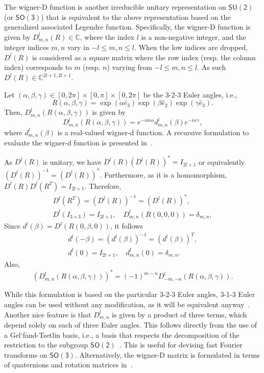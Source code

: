 \documentclass{ieeetran}
\newcommand{\SO}{\ensuremath{\mathsf{SO(3)}}}
\newcommand{\Cp}{\ensuremath{\mathbb{C}}}
\begin{document}
The wigner-D function is another irreducible unitary representation on $\mathsf{SU(2)}$ (or $\SO$) that is equivalent to the above representation based on the generalized associated Legendre function. Specifically, the wigner-D function is given by $D^l_{m,n}(R)\in\Cp$, where the index $l$ is a non-negative integer, and the integer indices $m,n$ vary in $-l\leq m,n \leq l$. When the low indices are dropped, $D^l(R)$ is considered as a square matrix where the row index (resp. the column index) corresponds to $m$ (resp. $n$) varying from $-l\leq m,n \leq l$. As such $D^l(R)\in\Cp^{2l+1,2l+1}$.

Let $(\alpha,\beta,\gamma)\in[0,2\pi]\times[0,\pi]\times[0,2\pi]$ be the 3-2-3 Euler angles, i.e., 
\[
R(\alpha,\beta,\gamma)=\exp(\alpha\hat e_3)\exp(\beta\hat e_2)\exp(\gamma\hat e_3). 
\]
Then, $D^l_{m,n}(R(\alpha,\beta,\gamma))$ is given by
\[
D^l_{m,n}(R(\alpha,\beta,\gamma)) = e^{-i m\alpha} d^l_{m,n}(\beta) e^{-i n\gamma},
\]
where $d^l_{m,n}(\beta)$ is a real-valued wigner-d function. A recursive formulation to evaluate the wigner-d function is presented in~\cite{BlaFloJMS97}. 

As $D^l(R)$ is unitary, we have $D^l(R)(D^{l}(R))^*=I_{2l+1}$ or equivalently $(D^l(R))^{-1}=(D^l(R))^*$. Furthermore, as it is a homomorphism, $D^l(R)D^l(R^T)=I_{2l+1}$. Therefore,
\begin{gather*}
D^l(R^T) = (D^l(R))^{-1} = (D^l(R))^*,\\
D^l(I_{3\times 3}) =I_{2l+1},\quad
D^l_{m,n}(R(0,0,0))=\delta_{m,n},
\end{gather*}
Since $d^l(\beta)=D^l(R(0,\beta,0))$, it follows
\begin{gather*}
d^l(-\beta) = (d^l(\beta))^{-1} = (d^l(\beta))^T,\\
d^l(0)=I_{2l+1},\quad d^l_{m,n}(0)=\delta_{m,n}.
\end{gather*}
Also,
\[
(D^l_{m,n}(R(\alpha,\beta,\gamma)))^*=(-1)^{m-n} D^l_{-m,-n}(R(\alpha,\beta,\gamma)).
\]

While this formulation is based on the particular 3-2-3 Euler angles, 3-1-3 Euler angles can be used without any modification, as it will be equivalent anyway~\cite{ChiKya01}. Another nice feature is that $D^l_{m,n}$ is given by a product of three terms, which depend solely on each of three Euler angles. This follows directly from the use of a Gel`fand-Tsetlin basis, i.e., a basis that respects the decomposition of the restriction to the subgroup $\mathsf{SO(2)}$~\cite{MasRocGC97}. This is useful for devising fast Fourier transforms on $\SO$. Alternatively, the wigner-D matrix is formulated in terms of quaternions and rotation matrices in~\cite{LynStoMS89}.
\end{document}
